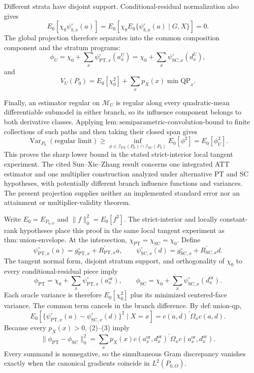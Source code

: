 Different strata have disjoint support.  Conditional-residual normalization also gives
\[
 E_0[\chi_0\psi^{\circ}_{b,x}(a)]
 =E_0\!\left[\chi_0E_0\{\psi^{\circ}_{b,x}(a)\mid G,X\}\right]=0.
 \tag{13}
\]
The global projection therefore separates into the common composition component and the stratum programs:
\[
 \phi_U=\chi_0+\sum_x\psi^{\circ}_{\mathrm{PT},x}(a_x^U)
 =\chi_0+\sum_x\psi^{\circ}_{\mathrm{SC},x}(d_x^U),
 \tag{14}
\]
and
\[
 V_U(P_0)=E_0[\chi_0^2]+\sum_xp_X(x)\min\mathrm{QP}_x.
 \tag{15}
\]

Finally, an estimator regular on \(\mathcal M_U\) is regular along every quadratic-mean differentiable submodel in either branch, so its influence component belongs to both derivative classes.  Applying \(\mathrm{lem{:}semiparametric\text{-}convolution\text{-}bound}\) to finite collections of such paths and then taking their closed span gives
\[
 \operatorname{Var}_{P_0}(\text{regular limit})
 \ge \inf_{\phi\in\mathcal I_{\mathrm{PT}}(P_0)\cap\mathcal I_{\mathrm{SC}}(P_0)}E_0[\phi^2]
 =E_0[\phi_U^2].
 \tag{16}
\]
This proves the sharp lower bound in the stated strict-interior local tangent experiment.  The cited Sun--Xie--Zhang result concerns one integrated ATT estimator and one multiplier construction analyzed under alternative PT and SC hypotheses, with potentially different branch influence functions and variances.  The present projection supplies neither an implemented standard error nor an attainment or multiplier-validity theorem.

Write \(E_0=E_{P_{0,O}}\) and \(\|f\|_0^2=E_0[f^2]\).  The strict-interior and locally constant-rank hypotheses place this proof in the same local tangent experiment as \(\mathrm{thm{:}union\text{-}envelope}\).  At the intersection, \(\chi_{\mathrm{PT}}=\chi_{\mathrm{SC}}=\chi_0\).  Define
\[
 \psi^{\circ}_{\mathrm{PT},x}(a)=g^{\circ}_{\mathrm{PT},x}+R_{\mathrm{PT},x}^{\prime}a,
 \qquad
 \psi^{\circ}_{\mathrm{SC},x}(d)=g^{\circ}_{\mathrm{SC},x}+R_{\mathrm{SC},x}^{\prime}d.
 \tag{1}
\]
The tangent normal form, disjoint stratum support, and orthogonality of \(\chi_0\) to every conditional-residual piece imply
\[
 \phi_{\mathrm{PT}}=\chi_0+\sum_x\psi^{\circ}_{\mathrm{PT},x}(a_x^{\mathrm{or}}),
 \qquad
 \phi_{\mathrm{SC}}=\chi_0+\sum_x\psi^{\circ}_{\mathrm{SC},x}(d_x^{\mathrm{or}}).
 \tag{2}
\]
Each oracle variance is therefore \(E_0[\chi_0^2]\) plus its minimized centered-face variance.  The common term cancels in the branch difference.  By \(\mathrm{def{:}union\text{-}qp}\),
\[
 E_0[\{\psi^{\circ}_{\mathrm{PT},x}(a)-\psi^{\circ}_{\mathrm{SC},x}(d)\}^2\mid X=x]
 =c(a,d)^{\prime}\Omega_xc(a,d).
 \tag{3}
\]
Because every \(p_X(x)>0\), (2)--(3) imply
\[
 \|\phi_{\mathrm{PT}}-\phi_{\mathrm{SC}}\|_0^2
 =\sum_xp_X(x)c(a_x^{\mathrm{or}},d_x^{\mathrm{or}})^{\prime}
 \Omega_xc(a_x^{\mathrm{or}},d_x^{\mathrm{or}}).
 \tag{4}
\]
Every summand is nonnegative, so the simultaneous Gram discrepancy vanishes exactly when the canonical gradients coincide in \(L^2(P_{0,O})\).

